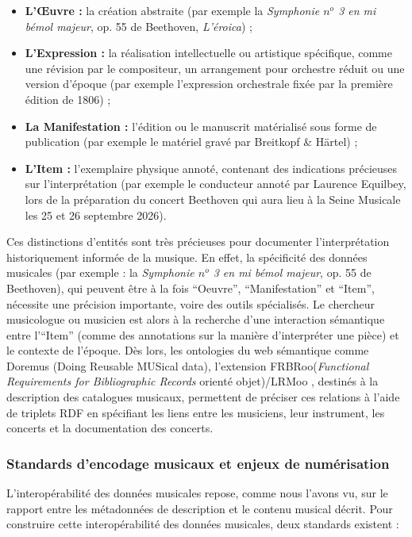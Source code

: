 \begin{itemize}
	\item \textbf{L'Œuvre :} la création abstraite (par exemple la \textit{Symphonie $n^o$ 3 en mi bémol majeur}, op. 55 de Beethoven, \textit{L'éroica}) ;
	\item \textbf{L'Expression :} la réalisation intellectuelle ou artistique spécifique, comme une révision par le compositeur, un arrangement pour orchestre réduit ou une version d'époque (par exemple l'expression orchestrale fixée par la première édition de 1806) ;
	\item \textbf{La Manifestation :} l'édition ou le manuscrit matérialisé sous forme de publication (par exemple  le matériel gravé par Breitkopf \& Härtel) ;
	\item \textbf{L'Item :} l'exemplaire physique annoté, contenant des indications précieuses sur l'interprétation (par exemple le conducteur annoté par Laurence Equilbey, lors de la préparation du concert Beethoven qui aura lieu à la Seine Musicale les 25 et 26 septembre 2026).
\end{itemize}


Ces distinctions d'entités sont très précieuses pour documenter l'interprétation historiquement informée de la musique. En effet, la spécificité des données musicales (par exemple : la \textit{Symphonie $n^o$ 3 en mi bémol majeur}, op. 55 de Beethoven), qui peuvent être à la fois \enquote{Oeuvre}, \enquote{Manifestation} et \enquote{Item}, nécessite une précision importante, voire des outils spécialisés. 
Le chercheur musicologue ou musicien est alors à la recherche d'une interaction sémantique entre l'\enquote{Item} (comme des annotations sur la manière d'interpréter une pièce) et le contexte de l'époque. 
Dès lors, les ontologies du web sémantique comme Doremus (Doing Reusable MUSical data), l'extension FRBRoo(\textit{Functional Requirements for Bibliographic Records} orienté objet)/LRMoo , destinés à la description des catalogues musicaux, permettent de préciser ces relations à l'aide de triplets RDF en spécifiant les liens entre les musiciens, leur instrument, les concerts et la documentation des concerts. 

\subsubsection*{Standards d'encodage musicaux et enjeux de numérisation}

L'interopérabilité des données musicales repose, comme nous l'avons vu, sur le rapport entre les métadonnées de description et le contenu musical décrit. Pour construire cette interopérabilité des données musicales, deux standards existent : 

